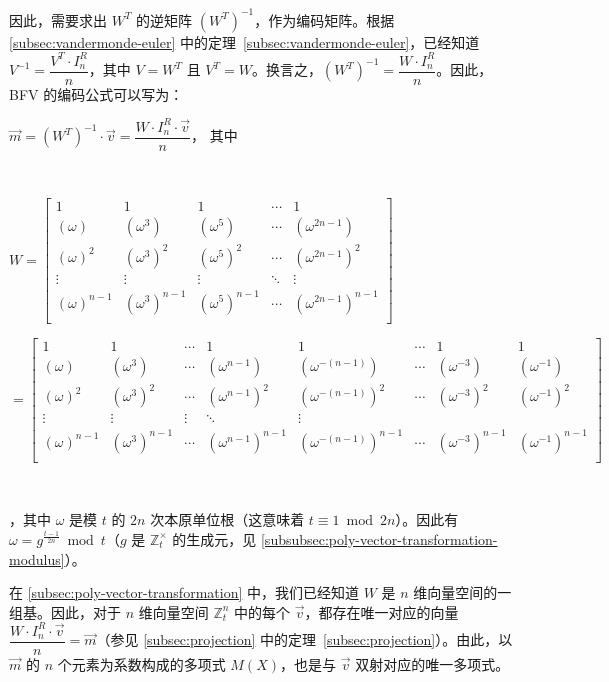 因此，需要求出 $W^T$ 的逆矩阵 $(W^T)^{-1}$，作为编码矩阵。根据 \autoref{subsec:vandermonde-euler} 中的定理~\ref*{subsec:vandermonde-euler}，已经知道 $V^{-1} = \dfrac{V^T \cdot I_n^R}{n}$，其中 $V = W^T$ 且 $V^T = W$。换言之，$(W^T)^{-1} = \dfrac{W \cdot I_n^R}{n}$。因此，BFV 的编码公式可以写为：

$\vec{m} = (W^T)^{-1} \cdot \vec{v} = \dfrac{W \cdot I_n^R \cdot \vec{v}}{n}$，\text{ } 其中

$ $

$W =  \begin{bmatrix}
1 & 1 & 1 & \cdots & 1\\
(\omega) & (\omega^3) & (\omega^5) & \cdots & (\omega^{2n-1})\\
(\omega)^2 & (\omega^3)^2 & (\omega^5)^2 & \cdots & (\omega^{2n-1})^2\\
\vdots & \vdots & \vdots & \ddots & \vdots \\
(\omega)^{n-1} & (\omega^3)^{n-1} & (\omega^5)^{n-1} & \cdots & (\omega^{2n-1})^{n-1}\\
\end{bmatrix}$

$= \begin{bmatrix}
1 & 1 & \cdots & 1 & 1 & \cdots & 1 & 1\\
(\omega) & (\omega^3) & \cdots & (\omega^{n - 1}) & (\omega^{-(n - 1)}) & \cdots & (\omega^{-3}) & (\omega^{-1})\\
(\omega)^2 & (\omega^3)^2 & \cdots & (\omega^{n - 1})^2 & (\omega^{-(n - 1)})^2 & \cdots & (\omega^{-3})^2 & (\omega^{-1})^2\\
\vdots & \vdots & \vdots & \ddots & \vdots \\
(\omega)^{n-1} & (\omega^3)^{n-1} & \cdots & (\omega^{n - 1})^{n-1} & (\omega^{-(n - 1)})^{n-1} & \cdots & (\omega^{-3})^{n-1} & (\omega^{-1})^{n-1}\\
\end{bmatrix}$

$ $

，其中 $\omega$ 是模 $t$ 的 $2n$ 次本原单位根（这意味着 $t \equiv 1 \bmod 2n$）。因此有 $\omega = g^{\frac{t - 1}{2n}} \bmod t$（$g$ 是 $\mathbb{Z}_t^{\times}$ 的生成元，见 \autoref{subsubsec:poly-vector-transformation-modulus}）。

在 \autoref{subsec:poly-vector-transformation} 中，我们已经知道 $W$ 是 $n$ 维向量空间的一组基。因此，对于 $n$ 维向量空间 $\mathbb{Z}_t^{n}$ 中的每个 $\vec{v}$，都存在唯一对应的向量 $\dfrac{W \cdot I_n^R\cdot\vec{v}}{n} = \vec{m}$（参见 \autoref{subsec:projection} 中的定理~\ref*{subsec:projection}）。由此，以 $\vec{m}$ 的 $n$ 个元素为系数构成的多项式 $M(X)$，也是与 $\vec{v}$ 双射对应的唯一多项式。

